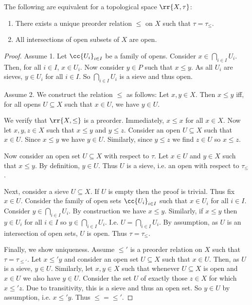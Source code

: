 \documentclass{article}
\begin{document}
\begin{claim}
  The following are equivalent for a topological space $\rr{X,\tau}$:
  \begin{enumerate}
    \item There exists a unique preorder relation $\leq$ on $X$ such that $\tau=\tau_\leq$.
    \item All intersections of open subsets of $X$ are open.
  \end{enumerate}
  \begin{proof}
    Assume 1. Let $\cc{U_i}_{i\in I}$ be a family of opens. Consider $x\in\bigcap_{i\in I} U_i$.
    Then, for all $i\in I$, $x\in U_i$. Now consider $y\in P$ such that $x\leq y$.
    As all $U_i$ are sieves, $y\in U_i$ for all $i\in I$. So $\bigcap_{i\in I} U_i$ is a sieve
    and thus open.

    Assume 2. We construct the relation $\leq$ as follows: Let $x,y\in X$. Then $x\leq y$
    iff, for all opens $U\subseteq X$ such that $x\in U$, we have $y\in U$.

    We verify that
    $\rr{X,\leq}$ is a preorder. Immediately, $x\leq x$ for all $x\in X$. Now let $x,y,z\in X$
    such that $x\leq y$ and $y\leq z$. Consider an open $U\subseteq X$ such that $x\in U$. Since
    $x\leq y$ we have $y\in U$. Similarly, since $y\leq z$ we find $z\in U$ so $x\leq z$.

    Now consider an open set $U\subseteq X$ with respect to $\tau$. Let $x\in U$ and $y\in X$
    such that $x\leq y$. By definition, $y\in U$. Thus $U$ is a sieve, i.e. an open with respect
    to $\tau_\leq$.

    Next, consider a sieve $U\subseteq X$. If $U$ is empty then the proof is trivial.
    Thus fix $x\in U$. Consider the family of open sets $\cc{U_i}_{i\in I}$ such that $x\in U_i$
    for all $i\in I$. Consider $y\in\bigcap_{i\in I} U_i$. By construction we have $x\leq y$.
    Similarly, if $x\leq y$ then $y\in U_i$ for all $i\in I$ so $y\in\bigcap_{i\in I} U_i$.
    I.e. $U=\bigcap_{i\in I} U_i$. By assumption, as $U$ is an intersection of open sets, $U$ is open.
    Thus $\tau = \tau_\leq$.

    Finally, we show uniqueness. Assume $\leq'$ is a preorder relation on $X$ such that $\tau=\tau_{\leq'}$.
    Let $x\leq' y$ and consider an open set $U\subseteq X$ such that $x\in U$. Then, as $U$ is a
    sieve, $y\in U$. Similarly, let $x,y\in X$ such that whenever $U\subseteq X$ is open and $x\in U$ we
    also have $y\in U$. Consider the set $U$ of exactly those $z\in X$ for which $x\leq' z$.
    Due to transitivity, this is a sieve and thus an open set. So $y\in U$ by assumption, i.e. $x\leq' y$.
    Thus $\leq = \leq'$.
  \end{proof}
\end{claim}
\end{document}
